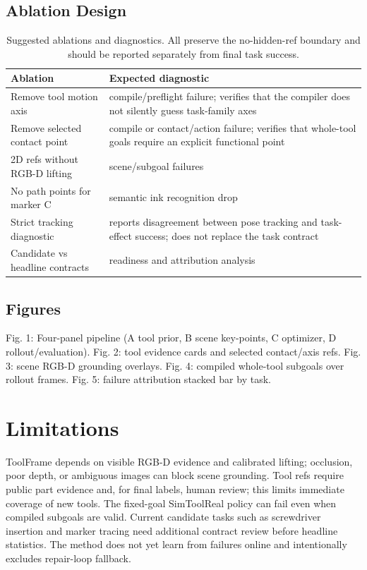 \documentclass[journal]{IEEEtran}
\newcommand{\method}{ToolFrame}
\begin{document}
\subsection{Ablation Design}
\begin{table}[t]
\centering
\caption{Suggested ablations and diagnostics. All preserve the no-hidden-ref
boundary and should be reported separately from final task success.}
\begin{tabular}{p{}p{}}
\toprule
Ablation & Expected diagnostic \\
\midrule
Remove tool motion axis & compile/preflight failure; verifies that the compiler does not silently guess task-family axes \\
Remove selected contact point & compile or contact/action failure; verifies that whole-tool goals require an explicit functional point \\
2D refs without RGB-D lifting & scene/subgoal failures \\
No path points for marker C & semantic ink recognition drop \\
Strict tracking diagnostic & reports disagreement between pose tracking and task-effect success; does not replace the task contract \\
Candidate vs headline contracts & readiness and attribution analysis \\
\bottomrule
\end{tabular}
\end{table}

\subsection{Figures}
Fig. 1: Four-panel pipeline (A tool prior, B scene key-points, C optimizer,
D rollout/evaluation). Fig. 2: tool evidence cards and selected
contact/axis refs. Fig. 3: scene RGB-D grounding overlays. Fig. 4: compiled
whole-tool subgoals over rollout frames. Fig. 5: failure attribution stacked
bar by task.

\section{Limitations}
\method{} depends on visible RGB-D evidence and calibrated lifting; occlusion,
poor depth, or ambiguous images can block scene grounding. Tool refs require
public part evidence and, for final labels, human review; this limits immediate
coverage of new tools. The fixed-goal SimToolReal policy can fail even when
compiled subgoals are valid. Current candidate tasks such as screwdriver
insertion and marker tracing need additional contract review before headline
statistics. The method does not yet learn from failures online and
intentionally excludes repair-loop fallback.
\end{document}
